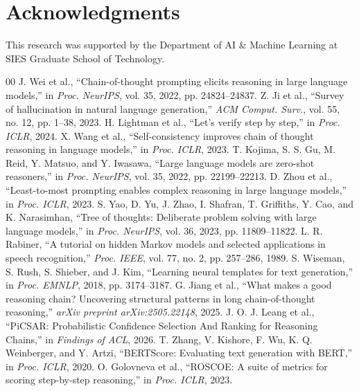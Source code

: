 \documentclass[conference]{IEEEtran}
\begin{document}
\section*{Acknowledgments}
This research was supported by the Department of AI \& Machine Learning at SIES Graduate School of Technology.

\footnotesize
\begin{thebibliography}{00}
\setlength{\itemsep}{0.5pt plus 0.5pt minus 0.5pt}
\setlength{\parskip}{0pt}
 J. Wei et al., ``Chain-of-thought prompting elicits reasoning in large language models,'' in \textit{Proc. NeurIPS}, vol. 35, 2022, pp. 24824--24837.
 Z. Ji et al., ``Survey of hallucination in natural language generation,'' \textit{ACM Comput. Surv.}, vol. 55, no. 12, pp. 1--38, 2023.
 H. Lightman et al., ``Let's verify step by step,'' in \textit{Proc. ICLR}, 2024.
 X. Wang et al., ``Self-consistency improves chain of thought reasoning in language models,'' in \textit{Proc. ICLR}, 2023.
 T. Kojima, S. S. Gu, M. Reid, Y. Matsuo, and Y. Iwasawa, ``Large language models are zero-shot reasoners,'' in \textit{Proc. NeurIPS}, vol. 35, 2022, pp. 22199--22213.
 D. Zhou et al., ``Least-to-most prompting enables complex reasoning in large language models,'' in \textit{Proc. ICLR}, 2023.
 S. Yao, D. Yu, J. Zhao, I. Shafran, T. Griffiths, Y. Cao, and K. Narasimhan, ``Tree of thoughts: Deliberate problem solving with large language models,'' in \textit{Proc. NeurIPS}, vol. 36, 2023, pp. 11809--11822.
 L. R. Rabiner, ``A tutorial on hidden Markov models and selected applications in speech recognition,'' \textit{Proc. IEEE}, vol. 77, no. 2, pp. 257--286, 1989.
 S. Wiseman, S. Rush, S. Shieber, and J. Kim, ``Learning neural templates for text generation,'' in \textit{Proc. EMNLP}, 2018, pp. 3174--3187.
 G. Jiang et al., ``What makes a good reasoning chain? Uncovering structural patterns in long chain-of-thought reasoning,'' \textit{arXiv preprint arXiv:2505.22148}, 2025.
 J. O. J. Leang et al., ``PiCSAR: Probabilistic Confidence Selection And Ranking for Reasoning Chains,'' in \textit{Findings of ACL}, 2026.
 T. Zhang, V. Kishore, F. Wu, K. Q. Weinberger, and Y. Artzi, ``BERTScore: Evaluating text generation with BERT,'' in \textit{Proc. ICLR}, 2020.
 O. Golovneva et al., ``ROSCOE: A suite of metrics for scoring step-by-step reasoning,'' in \textit{Proc. ICLR}, 2023.

\end{thebibliography}
\end{document}
